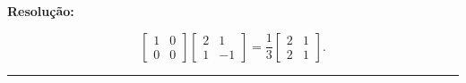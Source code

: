 \documentclass[leqno]{article}
\numberwithin{equation}{section}
\newenvironment{sol} 
{
    \vspace{4mm}
    \noindent\textbf{Resolução:}
    \strut\newline
    \smallskip
    \hspace{-3.5mm} 
} 
{\noindent\rule{4cm}{.1mm}}
\begin{document}
\begin{enumerate}
\begin{sol}
\begin{enumerate}[label=(\alph*)]
\begin{equation*}
                \begin{bmatrix}
                    1 & 0 \\
                    0 & 0
                \end{bmatrix}
                \begin{bmatrix}
                    2 & 1 \\
                    1 & -1
                \end{bmatrix}
                =
                \frac{ 1 }{ 3 }
                \begin{bmatrix}
                    2 & 1 \\
                    2 & 1
                \end{bmatrix}
            .\end{equation*}


\end{enumerate}
\end{sol}
\end{enumerate}
\end{document}
